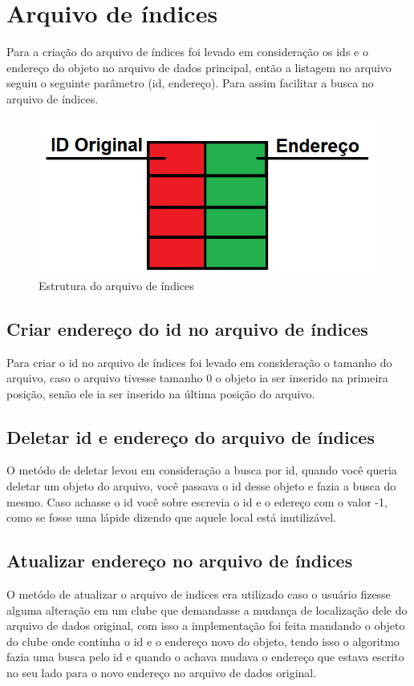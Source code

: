 \documentclass[12pt]{article}
\begin{document}
\section{Arquivo de índices}
Para a criação do arquivo de índices foi levado em consideração os ids e o endereço do objeto no arquivo de dados principal, então a listagem no arquivo seguiu o seguinte parâmetro (id, endereço). Para assim facilitar a busca no arquivo de índices.

\begin{figure}[ht]
\centering
\includegraphics[width=.4\textwidth]{indice.png}
\caption{Estrutura do arquivo de índices}
\label{fig:create1}
\end{figure}

\subsection{Criar endereço do id no arquivo de índices}
Para criar o id no arquivo de índices foi levado em consideração o tamanho do arquivo, caso o arquivo tivesse tamanho 0 o objeto ia ser inserido na primeira posição, senão ele ia ser inserido na última posição do arquivo.

\subsection{Deletar id e endereço do arquivo de índices}
O metódo de deletar levou em consideração a busca por id, quando você queria deletar um objeto do arquivo, você passava o id desse objeto e fazia a busca do mesmo. Caso achasse o id você sobre escrevia o id e o edereço com o valor -1, como se fosse uma lápide dizendo que aquele local está inutilizável.

\subsection{Atualizar endereço no arquivo de índices}
O metódo de atualizar o arquivo de indices era utilizado caso o usuário fizesse alguma alteração em um clube que demandasse a mudança de localização dele do arquivo de dados original, com isso a implementação foi feita mandando o objeto do clube onde continha o id e o endereço novo do objeto, tendo isso o algoritmo fazia uma busca pelo id e quando o achava mudava o endereço que estava escrito no seu lado para o novo endereço no arquivo de dados original.
\end{document}
